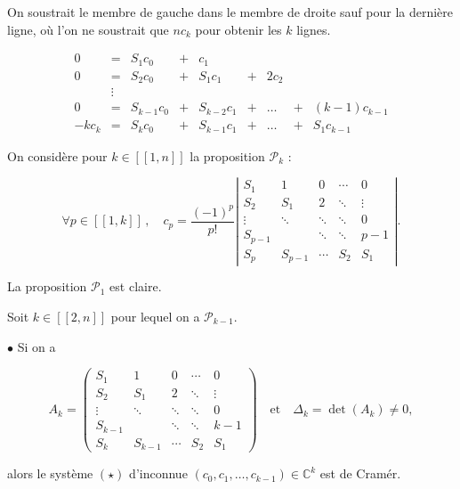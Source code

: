 \begin{enumerate}
On soustrait le membre de gauche dans le membre de droite sauf pour la dernière ligne, où l'on ne soustrait que \( nc_k \) pour obtenir les \( k \) lignes.
 
\[ \begin{array}{rrrrrrrrr}
0&=&S_1c_0&+&c_1& &      & & 
\\
0&=&S_2c_0&+&S_1c_1&+&2c_2& & 
\\
& \vdots  &      & &      & &      & & 
\\
0&=&S_{k-1}c_0&+&S_{k-2}c_1&+&\ldots&+&(k-1)c_{k-1}
\\
-kc_{k}&=&S_{k}c_0&+&S_{k-1}c_1&+&\ldots&+&S_1c_{k-1}
\end{array} \tag{$\star$}\]
 
On considère pour \( k \in [\![1,n]\!] \) la proposition \( \mathcal P_k \) :
 
\[
\forall p \in [\![1,k]\!] \,, \quad
c_{p}=\frac{(-1)^{p}}{p !}\left|\begin{array}{ccccc}
S_1 & {1} & {0} & {\cdots} & {0} \\
S_2 & S_1 & {2} & {\ddots} & {\vdots} \\
{\vdots} & {\ddots} & {\ddots} & {\ddots} & {0} \\
S_{p-1} & {} & {\ddots} & {\ddots} & {p-1} \\
S_p & S_{p-1} & {\cdots} & S_2 & S_1
\end{array}\right|. \]
 
La proposition \( \mathcal P_1 \) est claire.
 

 
Soit \( k \in [\![2,n]\!] \) pour lequel on a \( \mathcal P_{k-1} \). 
 

 
\( \bullet \) Si on a
 
\[ A_k = \left(\begin{array}{ccccc}
S_1 & {1} & {0} & {\cdots} & {0} \\
S_2 & S_1 & {2} & {\ddots} & {\vdots} \\
{\vdots} & {\ddots} & {\ddots} & {\ddots} & {0} \\
S_{k-1} & {} & {\ddots} & {\ddots} & {k-1} \\
S_k & S_{k-1} & {\cdots} & S_2 & S_1
\end{array}\right)
\quad\text{et}\quad
\Delta_k = \det(A_k) \neq 0, \]
 
alors le système \( (\star) \) d'inconnue \( (c_0,c_1, \ldots, c_{k-1}) \in \mathbb C^k \) est de Cramér.\\ 
 

\end{enumerate}
